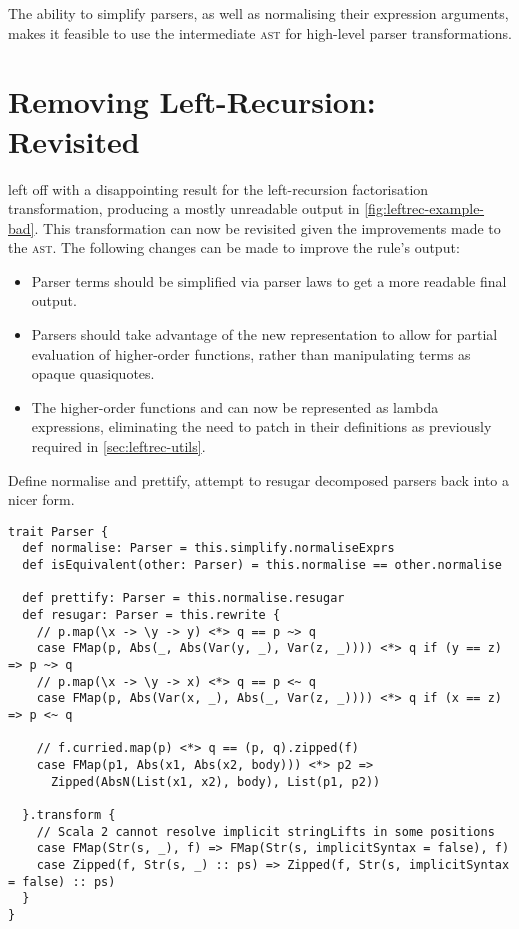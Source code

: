 \documentclass[../../main.tex]{subfiles}
\begin{document}
\label{sec:complex-rules}
The ability to simplify parsers, as well as normalising their expression arguments, makes it feasible to use the intermediate  \textsc{ast} for high-level parser transformations.

\section{Removing Left-Recursion: Revisited}
 left off with a disappointing result for the left-recursion factorisation transformation, producing a mostly unreadable output in \cref{fig:leftrec-example-bad}.
This transformation can now be revisited given the improvements made to the  \textsc{ast}.
The following changes can be made to improve the rule's output:
\begin{itemize}
  \item Parser terms should be simplified via parser laws to get a more readable final output.
  \item Parsers should take advantage of the new  representation to allow for partial evaluation of higher-order functions, rather than manipulating terms as opaque quasiquotes.
  \item The higher-order functions  and  can now be represented as  lambda expressions, eliminating the need to patch in their definitions as previously required in \cref{sec:leftrec-utils}.
\end{itemize}

Define normalise and prettify, attempt to resugar decomposed parsers back into a nicer form.

\begin{verbatim}
trait Parser {
  def normalise: Parser = this.simplify.normaliseExprs
  def isEquivalent(other: Parser) = this.normalise == other.normalise

  def prettify: Parser = this.normalise.resugar
  def resugar: Parser = this.rewrite {
    // p.map(\x -> \y -> y) <*> q == p ~> q
    case FMap(p, Abs(_, Abs(Var(y, _), Var(z, _)))) <*> q if (y == z) => p ~> q
    // p.map(\x -> \y -> x) <*> q == p <~ q
    case FMap(p, Abs(Var(x, _), Abs(_, Var(z, _)))) <*> q if (x == z) => p <~ q

    // f.curried.map(p) <*> q == (p, q).zipped(f)
    case FMap(p1, Abs(x1, Abs(x2, body))) <*> p2 =>
      Zipped(AbsN(List(x1, x2), body), List(p1, p2))

  }.transform {
    // Scala 2 cannot resolve implicit stringLifts in some positions
    case FMap(Str(s, _), f) => FMap(Str(s, implicitSyntax = false), f)
    case Zipped(f, Str(s, _) :: ps) => Zipped(f, Str(s, implicitSyntax = false) :: ps)
  }
}
\end{verbatim}
\end{document}
